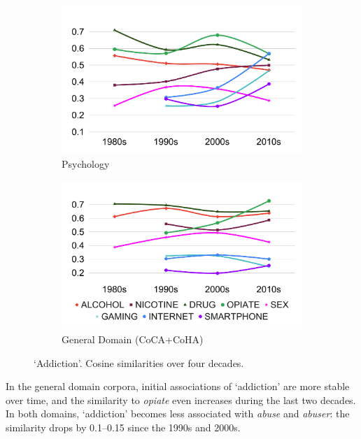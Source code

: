 \documentclass[output=paper]{langsci/langscibook}
\begin{document}
\begin{figure}[H]
  \begin{subfigure}[b]{.5\linewidth}
        \includegraphics[width=\textwidth]{figures/VYLOMOVA_addiction-psych.pdf}
        \caption{Psychology}
        \end{subfigure}\begin{subfigure}[b]{.5\linewidth}
        \includegraphics[width=\textwidth]{figures/VYLOMOVA_addiction-coca.pdf}
        \caption{General Domain (CoCA+CoHA)}
        \end{subfigure}
\caption{`Addiction'. Cosine similarities over four decades.\label{fig:w2v-cos-sim-addiction}}
\end{figure}

In the general domain corpora, initial associations of `addiction' are more stable over time, and the similarity to \textit{opiate} even increases during the last two decades.
In both domains, `addiction' becomes less associated with \textit{abuse} and \textit{abuser}: the similarity drops by 0.1--0.15 since the 1990s and 2000s.
\end{document}
